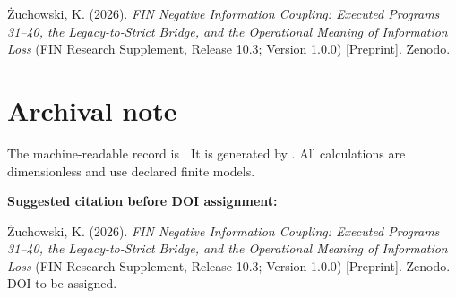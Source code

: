 \documentclass[11pt,a4paper,openany]{report}
\begin{document}
Żuchowski, K. (2026). \emph{FIN Negative Information Coupling: Executed Programs 31–40, the Legacy-to-Strict Bridge, and the Operational Meaning of Information Loss} (FIN Research Supplement, Release 10.3; Version 1.0.0) [Preprint]. Zenodo.


\clearpage
\chapter*{Archival note}
The machine-readable record is . It is generated by . All calculations are dimensionless and use declared finite models.

\medskip
\noindent\textbf{Suggested citation before DOI assignment:}

Żuchowski, K. (2026). \emph{FIN Negative Information Coupling: Executed Programs 31--40, the Legacy-to-Strict Bridge, and the Operational Meaning of Information Loss} (FIN Research Supplement, Release 10.3; Version 1.0.0) [Preprint]. Zenodo. DOI to be assigned.
\end{document}
